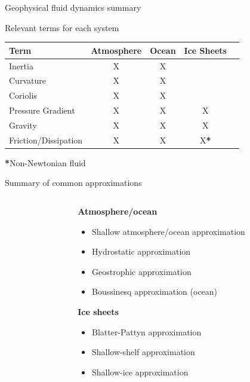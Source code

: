 \documentclass[aspectratio=169,xcolor=dvipsnames]{beamer}
\begin{document}

\begin{frame}{Geophysical fluid dynamics summary}

Relevant terms for each system

\begin{table}[h!]
\centering
\renewcommand{\arraystretch}{1.4}
\begin{tabular}{@{}lcccc@{}}
\toprule
\textbf{Term} & \textbf{Atmosphere} & \textbf{Ocean} & \textbf{Ice Sheets} \\ \midrule
Inertia              & X   & X   &     \\
Curvature            & X   & X   &     \\
Coriolis             & X   & X   &     \\
Pressure Gradient    & X   & X   & X\hspace{0.5em}   \\
Gravity              & X   & X   & X\hspace{0.5em}   \\
Friction/Dissipation & X   & X   & X\textbf{*}\\
\bottomrule
\end{tabular}
\end{table}
\hspace{25em}\textbf{*}Non-Newtonian fluid

\end{frame}

\begin{frame}{Summary of common approximations}

\vspace{1em}

\begin{columns}
    \begin{column}{0.15\textwidth}
    \end{column}
    \begin{column}{0.85\textwidth}
        \textbf{Atmosphere/ocean}
        \begin{itemize}
            \item Shallow atmosphere/ocean approximation
            \item Hydrostatic approximation
            \item Geostrophic approximation
            \item Boussinesq approximation (ocean)
        \end{itemize}

        \vspace{1em}
        
        \textbf{Ice sheets}
        \begin{itemize}
            \item Blatter-Pattyn approximation
            \item Shallow-shelf approximation
            \item Shallow-ice approximation
        \end{itemize}
    \end{column}
\end{columns}

\end{frame}
\end{document}
